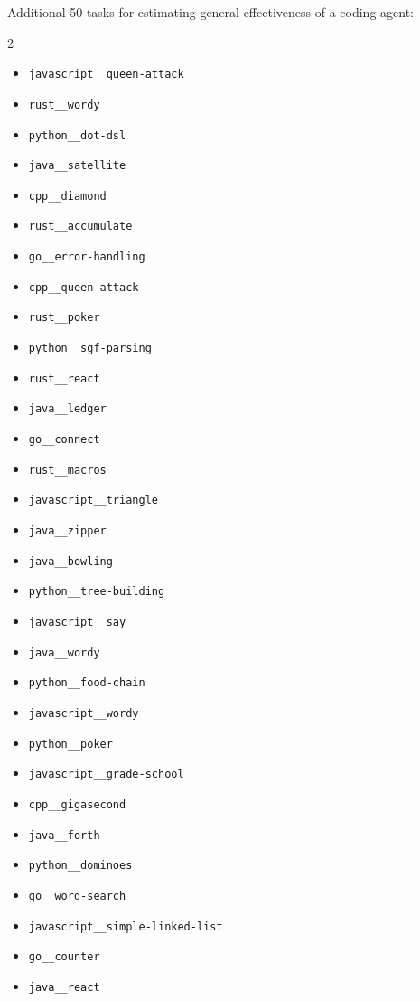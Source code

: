\documentclass{article}
\begin{document}
Additional 50 tasks for estimating general effectiveness of a coding agent:

\begin{multicols}{2}
\begin{itemize}
    \item \texttt{javascript\_\_queen-attack}
    \item \texttt{rust\_\_wordy}
    \item \texttt{python\_\_dot-dsl}
    \item \texttt{java\_\_satellite}
    \item \texttt{cpp\_\_diamond}
    \item \texttt{rust\_\_accumulate}
    \item \texttt{go\_\_error-handling}
    \item \texttt{cpp\_\_queen-attack}
    \item \texttt{rust\_\_poker}
    \item \texttt{python\_\_sgf-parsing}
    \item \texttt{rust\_\_react}
    \item \texttt{java\_\_ledger}
    \item \texttt{go\_\_connect}
    \item \texttt{rust\_\_macros}
    \item \texttt{javascript\_\_triangle}
    \item \texttt{java\_\_zipper}
    \item \texttt{java\_\_bowling}
    \item \texttt{python\_\_tree-building}
    \item \texttt{javascript\_\_say}
    \item \texttt{java\_\_wordy}
    \item \texttt{python\_\_food-chain}
    \item \texttt{javascript\_\_wordy}
    \item \texttt{python\_\_poker}
    \item \texttt{javascript\_\_grade-school}
    \item \texttt{cpp\_\_gigasecond}
    \item \texttt{java\_\_forth}
    \item \texttt{python\_\_dominoes}
    \item \texttt{go\_\_word-search}
    \item \texttt{javascript\_\_simple-linked-list}
    \item \texttt{go\_\_counter}
    \item \texttt{java\_\_react}

\end{itemize}
\end{multicols}
\end{document}
